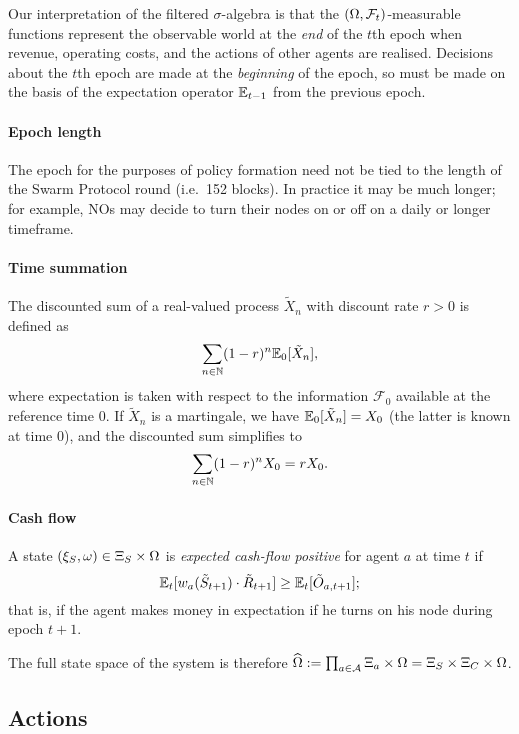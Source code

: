 Our interpretation of the filtered $\sigma$-algebra is that the $(\Omega,\mathcal{F}_t)$-measurable functions represent the observable world at the \emph{end} of the $t$th epoch when revenue, operating costs, and the actions of other agents are realised.
%
Decisions about the $t$th epoch are made at the \emph{beginning} of the epoch, so must be made on the basis of the expectation operator $\mathbb{E}_{t-1}$ from the previous epoch.

\paragraph{Epoch length}
%
The epoch for the purposes of policy formation need not be tied to the length of the Swarm Protocol round (i.e.~152 blocks).
%
In practice it may be much longer; for example, NOs may decide to turn their nodes on or off on a daily or longer timeframe.

\paragraph{Time summation}
%
The discounted sum of a real-valued process $\tilde{X}_n$ with discount rate $r>0$ is defined as
\[
  \sum_{n\in\mathbb{N}}(1-r)^n\mathbb{E}_0[\tilde{X}_n],
\]
where expectation is taken with respect to the information $\mathcal{F}_0$ available at the reference time $0$.
%
If $\tilde{X}_n$ is a martingale, we have $\mathbb{E}_0[\tilde{X}_n]=X_0$ (the latter is known at time $0$), and the discounted sum simplifies to 
\[
  \sum_{n\in\mathbb{N}} (1-r)^n X_0 = rX_0.
\]

\paragraph{Cash flow}
A state $(\xi_S,\omega)\in\Xi_S\times \Omega$ is \emph{expected cash-flow positive} for agent $a$ at time $t$ if 
\[
  \mathbb{E}_t[w_a(\tilde S_{t+1})\cdot \tilde{R}_{t+1}] \geq \mathbb{E}_t[ \tilde{O}_{a,t+1} ];
\]
that is, if the agent makes money in expectation if he turns on his node during epoch $t+1$.

  
The full state space of the system is therefore $\widehat{\Omega}:=\prod_{a\in\mathcal{A}}\Xi_a\times \Omega = \Xi_S\times\Xi_C\times\Omega$.

\subsection{Actions}


